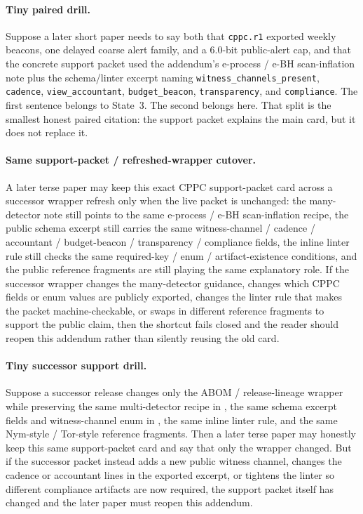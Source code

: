 \documentclass[11pt]{article}
\theoremstyle{definition}
\theoremstyle{remark}
\begin{document}
\paragraph{Tiny paired drill.}
Suppose a later short paper needs to say both that \texttt{cppc.r1} exported weekly beacons, one delayed coarse alert family, and a $6.0$-bit public-alert cap, and that the concrete support packet used the addendum's e-process / e-BH scan-inflation note plus the schema/linter excerpt naming \texttt{witness\_channels\_present}, \texttt{cadence}, \texttt{view\_accountant}, \texttt{budget\_beacon}, \texttt{transparency}, and \texttt{compliance}.
The first sentence belongs to State~3.
The second belongs here.
That split is the smallest honest paired citation: the support packet explains the main card, but it does not replace it.\cite{series:state3}

\paragraph{Same support-packet / refreshed-wrapper cutover.}
A later terse paper may keep this exact CPPC support-packet card across a successor wrapper refresh only when the live packet is unchanged: the many-detector note still points to the same e-process / e-BH scan-inflation recipe, the public schema excerpt still carries the same witness-channel / cadence / accountant / budget-beacon / transparency / compliance fields, the inline linter rule still checks the same required-key / enum / artifact-existence conditions, and the public reference fragments are still playing the same explanatory role.
If the successor wrapper changes the many-detector guidance, changes which CPPC fields or enum values are publicly exported, changes the linter rule that makes the packet machine-checkable, or swaps in different reference fragments to support the public claim, then the shortcut fails closed and the reader should reopen this addendum rather than silently reusing the old card.

\paragraph{Tiny successor support drill.}
Suppose a successor release changes only the ABOM / release-lineage wrapper while preserving the same multi-detector recipe in , the same schema excerpt fields and witness-channel enum in , the same inline linter rule, and the same Nym-style / Tor-style reference fragments.
Then a later terse paper may honestly keep this same support-packet card and say that only the wrapper changed.
But if the successor packet instead adds a new public witness channel, changes the cadence or accountant lines in the exported excerpt, or tightens the linter so different compliance artifacts are now required, the support packet itself has changed and the later paper must reopen this addendum.
\end{document}
